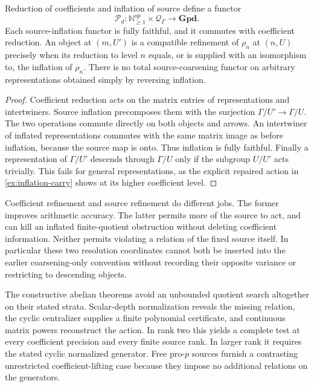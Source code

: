 \begin{proposition}\label{prop:mixed-source-variance}
Reduction of coefficients and inflation of source define a functor
\[
 \mathscr P_d:\mathbb N_{\geq1}^{op}\times\mathcal Q_\Gamma
 \longrightarrow\mathbf{Gpd}.
\]
Each source-inflation functor is fully faithful, and it commutes with coefficient reduction. An object at $(m,U')$ is a compatible refinement of $\rho_n$ at $(n,U)$ precisely when its reduction to level $n$ equals, or is supplied with an isomorphism to, the inflation of $\rho_n$. There is no total source-coarsening functor on arbitrary representations obtained simply by reversing inflation.
\end{proposition}
\begin{proof}
Coefficient reduction acts on the matrix entries of representations and intertwiners. Source inflation precomposes them with the surjection $\Gamma/U'\to\Gamma/U$. The two operations commute directly on both objects and arrows. An intertwiner of inflated representations commutes with the same matrix image as before inflation, because the source map is onto. Thus inflation is fully faithful. Finally a representation of $\Gamma/U'$ descends through $\Gamma/U$ only if the subgroup $U/U'$ acts trivially. This fails for general representations, as the explicit repaired action in \cref{ex:inflation-carry} shows at its higher coefficient level.
\end{proof}

Coefficient refinement and source refinement do different jobs. The former improves arithmetic accuracy. The latter permits more of the source to act, and can kill an inflated finite-quotient obstruction without deleting coefficient information. Neither permits violating a relation of the fixed source itself. In particular these two resolution coordinates cannot both be inserted into the earlier coarsening-only convention without recording their opposite variance or restricting to descending objects.

The constructive abelian theorems avoid an unbounded quotient search altogether on their stated strata. Scalar-depth normalization reveals the missing relation, the cyclic centralizer supplies a finite polynomial certificate, and continuous matrix powers reconstruct the action. In rank two this yields a complete test at every coefficient precision and every finite source rank. In larger rank it requires the stated cyclic normalized generator. Free pro-$p$ sources furnish a contrasting unrestricted coefficient-lifting case because they impose no additional relations on the generators.

